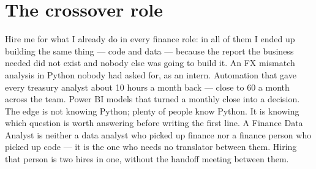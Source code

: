 \documentclass[a4paper,10pt]{article}
\begin{document}
\section*{The crossover role}
Hire me for what I already do in every finance role: in all of them I ended up building the same thing --- code and data --- because the report the business needed did not exist and nobody else was going to build it. An FX mismatch analysis in Python nobody had asked for, as an intern. Automation that gave every treasury analyst about 10 hours a month back --- close to 60 a month across the team. Power BI models that turned a monthly close into a decision. The edge is not knowing Python; plenty of people know Python. It is knowing which question is worth answering before writing the first line. A Finance Data Analyst is neither a data analyst who picked up finance nor a finance person who picked up code --- it is the one who needs no translator between them. Hiring that person is two hires in one, without the handoff meeting between them.
\end{document}
